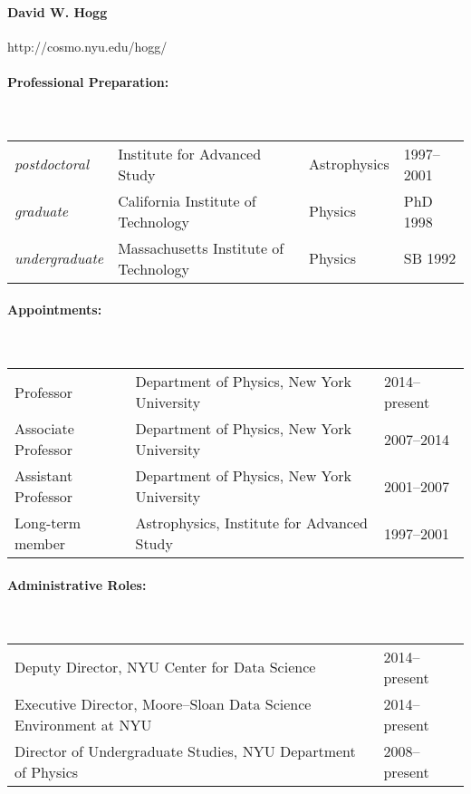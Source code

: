 \documentclass[letterpaper,12pt]{article}
\begin{document}
\paragraph{David W. Hogg} http://cosmo.nyu.edu/hogg/

\paragraph{Professional Preparation:}~\\[3pt]
\begin{tabular}{llll}
\textsl{postdoctoral}
  & Institute for Advanced Study          & Astrophysics & 1997--2001\\
\textsl{graduate}
  & California Institute of Technology    & Physics & PhD 1998\\
\textsl{undergraduate}
  & Massachusetts Institute of Technology & Physics & SB 1992\\
\end{tabular}
           
\paragraph{Appointments:}~\\[3pt]
\begin{tabular}{lll}
Professor           & Department of Physics, New York University & 2014--present \\
Associate Professor & Department of Physics, New York University & 2007--2014 \\
Assistant Professor & Department of Physics, New York University & 2001--2007 \\
Long-term member    & Astrophysics, Institute for Advanced Study & 1997--2001 \\
\end{tabular}

\paragraph{Administrative Roles:}~\\[3pt]
\begin{tabular}{ll}
Deputy Director, NYU Center for Data Science & 2014--present \\
Executive Director, Moore--Sloan Data Science Environment at NYU & 2014--present \\
Director of Undergraduate Studies, NYU Department of Physics & 2008--present \\
\end{tabular}
\end{document}
